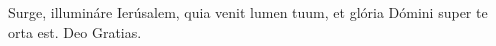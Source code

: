 Surge, illumináre Ierúsalem, quia venit lumen tuum, et glória Dómini super te orta est. \rubric{\Rbar\ }Deo Gratias.